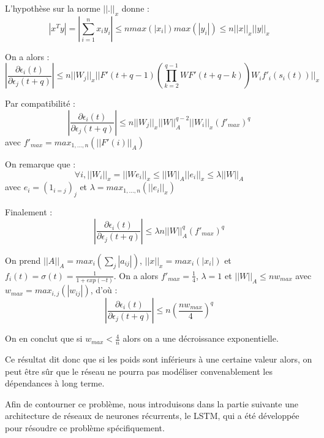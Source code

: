 L'hypothèse sur la norme $||.||_x$ donne :
$$
|x^Ty| = |\sum_{i=1}^{n}{x_iy_i}| \leq n max(|x_i|) max(|y_i|) \leq n||x||_x ||y||_x
$$

On a alors :
$$
|\frac{\partial \epsilon_i(t)}{\partial \epsilon_j(t+q)}| \leq n ||W_j||_x ||F'(t + q - 1)(\prod_{k = 2}^{q-1}{WF'(t + q - k)})W_if'_i(s_i(t))||_x
$$

Par compatibilité :
$$
|\frac{\partial \epsilon_i(t)}{\partial \epsilon_j(t+q)}| \leq n ||W_j||_x ||W||_A^{q-2} ||W_i||_x (f'_{max})^{q}
$$
avec $f'_{max} = max_{1, ..., n}(||F'(i)||_A)$

On remarque que :
$$
\forall i, ||W_i||_x = ||We_i||_x \leq ||W||_A ||e_i||_x \leq \lambda ||W||_A
$$
avec $e_i=(1_{i=j})_j$ et $\lambda = max_{1, ..., n}(||e_i||_x)$

Finalement :
$$
|\frac{\partial \epsilon_i(t)}{\partial \epsilon_j(t+q)}| \leq \lambda n ||W||_A^{q}(f'_{max})^{q}
$$

On prend $||A||_A = max_i(\sum_{j}{|a_{ij}|})$, $||x||_x = max_i(|x_i|)$ et $f_i(t) = \sigma(t) = \frac{1}{1+exp(-t)}$. On a alors $f'_{max} = \frac{1}{4}$, $\lambda = 1$ et $||W||_A \leq n w_{max}$ avec $w_{max} = max_{i,j}(|w_{ij}|)$, d'où :
$$
|\frac{\partial \epsilon_i(t)}{\partial \epsilon_j(t+q)}| \leq n (\frac{nw_{max}}{4})^{q}
$$

On en conclut que si $w_{max} < \frac{4}{n}$ alors on a une décroissance exponentielle.

Ce résultat dit donc que si les poids sont inférieurs à une certaine valeur alors, on peut être sûr que le réseau ne pourra pas modéliser convenablement les dépendances à long terme.

Afin de contourner ce problème, nous introduisons dans la partie suivante une architecture de réseaux de neurones récurrents, le LSTM, qui a été développée pour résoudre ce problème spécifiquement.